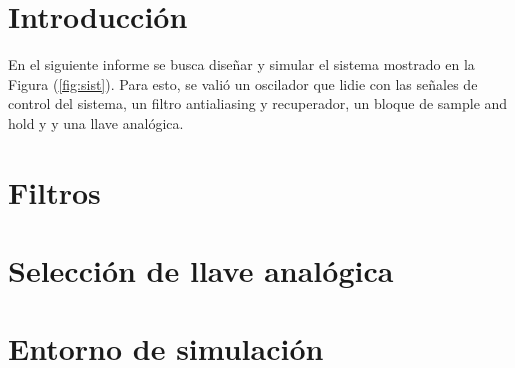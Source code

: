 







\tableofcontents
\newpage


\section{Introducción}

En el siguiente informe se busca diseñar y simular el sistema mostrado en la Figura (\ref{fig:sist}). Para esto, se valió un oscilador que lidie con las señales de control del sistema, un filtro antialiasing y recuperador, un bloque de sample and hold y y una llave analógica.

\section{Filtros}
	\label{Ejercicio-2}
	

\section{Selección de llave analógica}
	\label{Ejercicio-3}
	
	
%	
%	



\section{Entorno de simulación}
	\label{Ejercicio-5}
	
